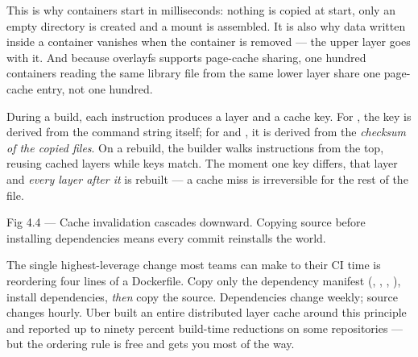 This is why containers start in milliseconds: nothing is copied at start, only an empty directory is created and a mount is assembled. It is also why data written inside a container vanishes when the container is removed --- the upper layer goes with it. And because overlayfs supports page-cache sharing, one hundred containers reading the same library file from the same lower layer share one page-cache entry, not one hundred.

 During a build, each instruction produces a layer and a cache key. For , the key is derived from the command string itself; for  and , it is derived from the \emph{checksum of the copied files}. On a rebuild, the builder walks instructions from the top, reusing cached layers while keys match. The moment one key differs, that layer and \emph{every layer after it} is rebuilt --- a cache miss is irreversible for the rest of the file.

\begin{wbfigure}{Fig 4.4 — Cache invalidation cascades downward. Copying source before installing dependencies means every commit reinstalls the world.}
\end{wbfigure}

\begin{perfnote}
The single highest-leverage change most teams can make to their CI time is reordering four lines of a Dockerfile. Copy only the dependency manifest (, , , ), install dependencies, \emph{then} copy the source. Dependencies change weekly; source changes hourly. Uber built an entire distributed layer cache around this principle and reported up to ninety percent build-time reductions on some repositories --- but the ordering rule is free and gets you most of the way.
\end{perfnote}

